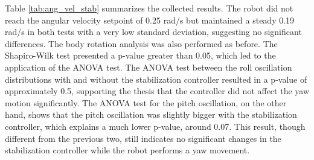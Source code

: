 \documentclass[conference]{IEEEtran}
\begin{document}
Table \ref{tab:ang_vel_stab} summarizes the collected results. The robot did not reach the angular velocity setpoint of 0.25 rad/s but maintained a steady 0.19 rad/s in both tests with a very low standard deviation, suggesting no significant differences. The body rotation analysis was also performed as before. The Shapiro-Wilk test presented a p-value greater than 0.05, which led to the application of the ANOVA test. The ANOVA test between the roll oscillation distributions with and without the stabilization controller resulted in a p-value of approximately 0.5, supporting the thesis that the controller did not affect the yaw motion significantly. The ANOVA test for the pitch oscillation, on the other hand, shows that the pitch oscillation was slightly bigger with the stabilization controller, which explains a much lower p-value, around 0.07. This result, though different from the previous two, still indicates no significant changes in the stabilization controller while the robot performs a yaw movement.

\begin{table}[!h]
  \centering
  \caption{Angular velocity and stability results.}
  \label{tab:ang_vel_stab}
\end{table}
\end{document}
